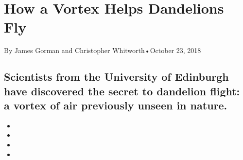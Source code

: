 \hypertarget{how-a-vortex-helps-dandelions-fly-1}{%
\section{How a Vortex Helps Dandelions
Fly}\label{how-a-vortex-helps-dandelions-fly-1}}

By James Gorman and Christopher Whitworth•October 23, 2018

\hypertarget{scientists-from-the-university-of-edinburgh-have-discovered-the-secret-to-dandelion-flight-a-vortex-of-air-previously-unseen-in-nature-1}{%
\subsection{Scientists from the University of Edinburgh have discovered
the secret to dandelion flight: a vortex of air previously unseen in
nature.}\label{scientists-from-the-university-of-edinburgh-have-discovered-the-secret-to-dandelion-flight-a-vortex-of-air-previously-unseen-in-nature-1}}

\begin{itemize}
\item
\item
\item
\item
\end{itemize}

